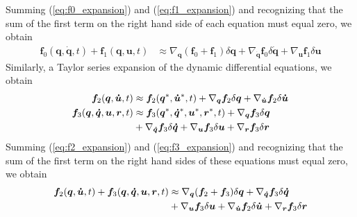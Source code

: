 \documentclass[smallcondensed]{svjour3}                     %
\begin{document}
Summing (\ref{eq:f0_expansion}) and (\ref{eq:f1_expansion}) and recognizing
that the sum of the first term on the right hand side of each equation must
equal zero, we obtain
\begin{align}
  \label{eq:f0_plus_f1_expansion}
  \bm{f}_{0}(\bm{q}, \bm{\dot{q}}, t) + \bm{f}_{1}(\bm{q}, \bm{u}, t) &\approx
  \nabla_{\bm{q}}(\bm{f}_{0} + \bm{f}_{1}) \delta\bm{q} +
  \nabla_{\bm{\dot{q}}}\bm{f}_{0} \delta\bm{\dot{q}} +
  \nabla_{\bm{u}}\bm{f}_{1} \delta\bm{u}
\end{align}
Similarly, a Taylor series expansion of the dynamic differential equations, we
obtain
\begin{align}
  \label{eq:f2_expansion}
  \bm{f}_{2}(\bm{q}, \bm{\dot{u}}, t) &\approx
      \bm{f}_{2}(\bm{q}^*, \bm{\dot{u}}^*, t) +
      \nabla_{\bm{q}}\bm{f}_{2} \delta\bm{q}
      + \nabla_{\bm{\dot{u}}}\bm{f}_{2} \delta\bm{\dot{u}}\\
  \bm{f}_{3}(\bm{q}, \bm{\dot{q}}, \bm{u}, \bm{r}, t) &\approx
  \bm{f}_{3}(\bm{q}^*, \bm{\dot{q}}^*, \bm{u}^*, \bm{r}^*, t) +
  \nabla_{\bm{q}}\bm{f}_{3} \delta\bm{q}\notag\\
  \label{eq:f3_expansion}
  &+ \nabla_{\bm{\dot{q}}}\bm{f}_{3} \delta\bm{\dot{q}}
  + \nabla_{\bm{u}}\bm{f}_{3} \delta \bm{u}
  + \nabla_{\bm{r}}\bm{f}_{3} \delta\bm{r}
\end{align}
Summing (\ref{eq:f2_expansion}) and (\ref{eq:f3_expansion}) and recognizing
that the sum of the first term on the right hand sides of these equations must
equal zero, we obtain
\begin{align}
  \bm{f}_{2}(\bm{q}, \bm{\dot{u}}, t) + \bm{f}_{3}(\bm{q}, \bm{\dot{q}},
  \bm{u}, \bm{r}, t) &\approx \nabla_{\bm{q}}(\bm{f}_2 + \bm{f}_3)
  \delta\bm{q} + \nabla_{\bm{\dot{q}}}\bm{f}_{3} \delta\bm{\dot{q}}\notag\\
  \label{eq:f2_plus_f3_expansion}
  &+ \nabla_{\bm{u}}\bm{f}_{3} \delta\bm{u} +
  \nabla_{\bm{\dot{u}}}\bm{f}_{2} \delta\bm{\dot{u}} + \nabla_{\bm{r}}\bm{f}_{3} \delta\bm{r}
\end{align}
\end{document}
